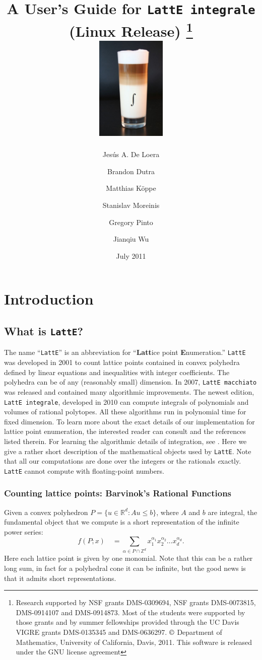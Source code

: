 \documentclass{article}
\title{A User's Guide for {\tt LattE integrale} \latteV \\ (Linux Release) 
\footnote{Research supported by NSF grants DMS-0309694, NSF grants
DMS-0073815, DMS-0914107 and DMS-0914873.
Most of the students were supported by those
grants and by summer fellowships provided through the UC Davis VIGRE grants
DMS-0135345 and DMS-0636297. $\copyright$ 
Department of Mathematics, University of California, Davis, 2011. This
software is released under the GNU license agreement}
\\ \includegraphics[width=0.25\textwidth]{latte-integrale.jpg}
}%
\author{Jes\'us A. De Loera \and
Brandon Dutra \and
Matthias K\"oppe \and 
Stanislav Moreinis \and
Gregory Pinto \and
Jianqiu Wu \and
}
\date{July 2011}
\newcommand{\Z}{{\mathbb Z}}
\newcommand{\R}{{\mathbb R}}
\newcommand{\latte}{{\tt LattE}\xspace}
\begin{document}
\maketitle{}

\newpage

\tableofcontents

\newpage

\section{Introduction}

\subsection{What is {\tt LattE}?} \label{intro}

The name ``{\tt LattE}'' is an abbreviation for ``{\bf Latt}ice point 
{\bf E}numeration.'' \latte was developed in 2001 to count lattice points contained in 
convex polyhedra defined by linear equations and inequalities with 
integer coefficients. The polyhedra can be of any (reasonably small) 
dimension. In 2007, {\tt LattE macchiato} was released and contained many 
algorithmic improvements. The newest edition, {\tt LattE integrale}, developed
in 2010 can compute integrals of polynomials and volumes of rational polytopes. 
All these algorithms run in polynomial
time for fixed dimension. To
learn more about the exact details of our implementation for lattice point enumeration, the interested reader can consult 
\cite{koeppe:irrational-barvinok, latte1} and the references listed therein. 
For learning the algorithmic details of integration, see \cite{howToIntegratePolynomialSimplex, latte-integrale-paper}. Here we
give a rather short description of the mathematical objects used by
{\tt LattE}. Note that all our computations are done over the integers or the rationals {\emph exactly}.
\latte cannot compute with floating-point numbers. 

\subsubsection{Counting lattice points: Barvinok's Rational Functions}

Given a convex polyhedron $P = \{u\in\R^d:Au\leq b\}$, where $A$ and
$b$ are integral, the fundamental object that we compute is a short 
representation of the infinite power series:
\[
f(P;x) \quad = \sum_{\alpha\in P\cap\Z^d} x_1^{\alpha_1}
x_2^{\alpha_2} \ldots x_d^{\alpha_d}.
\]
Here each lattice point is given by one monomial. Note that this can be 
a rather long sum, in fact for a polyhedral cone it can be infinite, but 
the good news is that it admits short representations.
\end{document}
